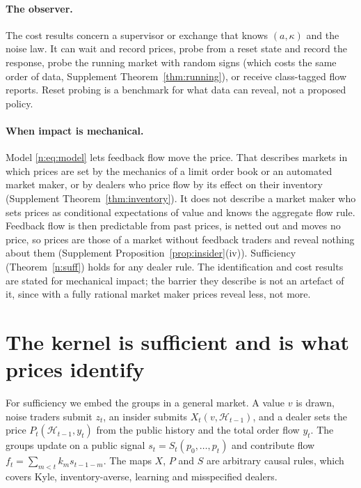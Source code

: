\documentclass[12pt]{article}
\theoremstyle{definition}
\theoremstyle{remark}
\begin{document}
\paragraph{The observer.} The cost results concern a supervisor or exchange that knows $(a,\kappa)$ and the noise law. It can wait and record prices, probe from a reset state and record the response, probe the running market with random signs (which costs the same order of data, Supplement Theorem~\ref{thm:running}), or receive class-tagged flow reports. Reset probing is a benchmark for what data can reveal, not a proposed policy.

\paragraph{When impact is mechanical.} Model \eqref{n:eq:model} lets feedback flow move the price. That describes markets in which prices are set by the mechanics of a limit order book or an automated market maker, or by dealers who price flow by its effect on their inventory (Supplement Theorem~\ref{thm:inventory}). It does not describe a market maker who sets prices as conditional expectations of value and knows the aggregate flow rule. Feedback flow is then predictable from past prices, is netted out and moves no price, so prices are those of a market without feedback traders and reveal nothing about them (Supplement Proposition~\ref{prop:insider}(iv)). Sufficiency (Theorem~\ref{n:suff}) holds for any dealer rule. The identification and cost results are stated for mechanical impact; the barrier they describe is not an artefact of it, since with a fully rational market maker prices reveal less, not more.

\section{The kernel is sufficient and is what prices identify}\label{n:suff_sec}

For sufficiency we embed the groups in a general market. A value $v$ is drawn, noise traders submit $z_t$, an insider submits $X_t(v,\mathcal H_{t-1})$, and a dealer sets the price $P_t(\mathcal H_{t-1},y_t)$ from the public history and the total order flow $y_t$. The groups update on a public signal $s_t=S_t(p_0,\ldots,p_t)$ and contribute flow $f_t=\sum_{m<t}k_ms_{t-1-m}$. The maps $X$, $P$ and $S$ are arbitrary causal rules, which covers Kyle, inventory-averse, learning and misspecified dealers.
\end{document}
